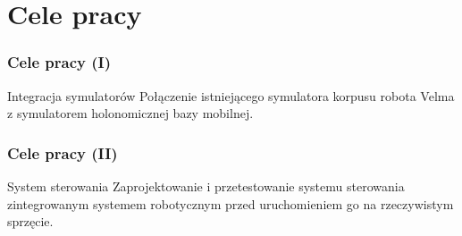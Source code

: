 \section{Cele pracy} 


\begin{frame}
\frametitle{Cele pracy (I)}
\begin{block}{Integracja symulatorów}
Połączenie istniejącego symulatora korpusu robota Velma z symulatorem holonomicznej bazy mobilnej.
\end{block}
\end{frame}


\begin{frame}
\frametitle{Cele pracy (II)}
\begin{block}{System sterowania}
Zaprojektowanie i przetestowanie systemu sterowania zintegrowanym systemem robotycznym przed uruchomieniem go na rzeczywistym sprzęcie.
\end{block}
\end{frame}

